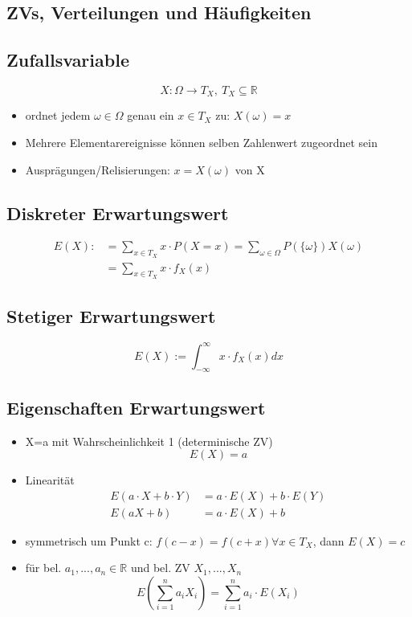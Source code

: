 \documentclass[10pt,a4paper,landscape]{article}
\begin{document}
\begin{multicols}{4}
\section{ZVs, Verteilungen und Häufigkeiten}

\subsection{Zufallsvariable}
\[
X:\Omega \rightarrow T_X , ~ T_X\subseteq \mathbb{R}
\]

\begin{itemize}
\item ordnet jedem $\omega \in \Omega$ genau ein $x \in T_X$ zu: $X(\omega)=x$
\item Mehrere Elementarereignisse können selben Zahlenwert zugeordnet sein
\item Ausprägungen/Relisierungen: $x=X(\omega)$ von X
\end{itemize}

\subsection{Diskreter Erwartungswert}
\begin{align*}
E(X) :&=\sum_{x\in T_X} x\cdot P(X=x) = \sum_{\omega \in \Omega} P(\{\omega\})X(\omega) \\
&= \sum_{x\in T_X} x\cdot f_X(x)
\end{align*}

\subsection{Stetiger Erwartungswert}
\[
E(X) := \int_{-\infty}^{\infty} x\cdot f_X(x)dx
\]

\subsection{Eigenschaften Erwartungswert}
\begin{itemize}
\item X=a mit Wahrscheinlichkeit 1 (determinische ZV)
\[
E(X)=a
\]
\item Linearität
\begin{align*}
E(a\cdot X + b \cdot Y) &= a\cdot E(X) + b \cdot	E(Y) \\
E(aX+b) &= a\cdot E(X) + b
\end{align*}
\item symmetrisch um Punkt c: $f(c-x)=f(c+x) \forall x \in T_X$, dann $E(X)=c$
\item für bel. $a_1,...,a_n \in \mathbb{R}$ und bel. ZV $X_1,...,X_n$
\[
E\left(\sum_{i=1}^na_iX_i\right)=\sum_{i=1}^na_i \cdot E(X_i)
\]
\end{itemize}


\end{multicols}
\end{document}
